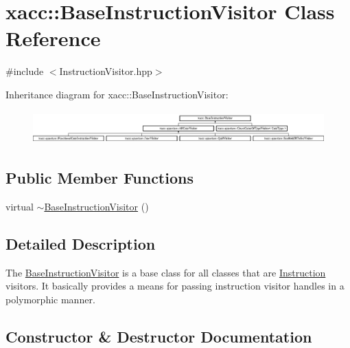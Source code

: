 \hypertarget{a01665}{}\section{xacc\+:\+:Base\+Instruction\+Visitor Class Reference}
\label{a01665}


{\ttfamily \#include $<$Instruction\+Visitor.\+hpp$>$}

Inheritance diagram for xacc\+:\+:Base\+Instruction\+Visitor\+:\begin{figure}[H]
\begin{center}
\leavevmode
\includegraphics[height=1.288344cm]{a01665}
\end{center}
\end{figure}
\subsection*{Public Member Functions}
\begin{DoxyCompactItemize}
\item 
virtual \hyperlink{a01665_aa6f5104f5868fe1eca9be4dc4036eba4}{$\sim$\+Base\+Instruction\+Visitor} ()
\end{DoxyCompactItemize}


\subsection{Detailed Description}
The \hyperlink{a01665}{Base\+Instruction\+Visitor} is a base class for all classes that are \hyperlink{a01657}{Instruction} visitors. It basically provides a means for passing instruction visitor handles in a polymorphic manner. 

\subsection{Constructor \& Destructor Documentation}
\mbox{\label{a01665_aa6f5104f5868fe1eca9be4dc4036eba4}} 
